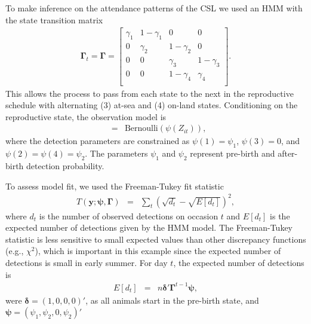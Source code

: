 \documentclass[12pt,english]{article}
\begin{document}
\begin{spacing}{1.9}
To make inference on the attendance patterns of the CSL we used an HMM
with the state transition matrix
\begin{eqnarray*}
  \boldsymbol{\Gamma}_t = \boldsymbol{\Gamma} =
  \left[ {\begin{array}{cccc}
            \gamma_1 & 1-\gamma_1 & 0 & 0 \\
            0 & \gamma_2 & 1-\gamma_2 & 0 \\
            0 & 0 & \gamma_3 & 1-\gamma_3 \\
            0 & 0 & 1-\gamma_4 & \gamma_4 \\
          \end{array} } \right].
\end{eqnarray*}
This allows the process to pass from each state to the next in the
reproductive schedule with alternating (3) at-sea and (4) on-land
states. Conditioning on the reproductive state, the observation model
is
\begin{eqnarray*}
  [y_{it}|Z_{it}] & = & \text{Bernoulli}(\psi(Z_{it})),
\end{eqnarray*}
where the detection parameters are constrained as $\psi(1) = \psi_1$,
$\psi(3) = 0$, and $\psi(2) = \psi(4) = \psi_2$. The parameters
$\psi_1$ and $\psi_2$ represent pre-birth and after-birth detection
probability.

To assess model fit, we used the Freeman-Tukey fit statistic
\begin{eqnarray*}
  T(\mathbf{y}; \boldsymbol{\psi},\boldsymbol{\Gamma}) & = &  \sum_t\left(\sqrt{d_t} - \sqrt{E[d_t]}\right)^2,
\end{eqnarray*}
where $d_t$ is the number of observed detections on occasion $t$ and
$E[d_t]$ is the expected number of detections given by the HMM
model. The Freeman-Tukey statistic is less sensitive to small expected values than other discrepancy
functions (e.g., $\chi^2$),
which is important in this example since the expected number of detections is small in early summer. 
For day $t$, the expected number of detections is
\begin{eqnarray*}
  E[d_t] & = & n \boldsymbol{\delta}'\boldsymbol{\Gamma}^{t-1}\boldsymbol{\psi},
\end{eqnarray*}
were $\boldsymbol{\delta} = (1, 0, 0, 0)'$, as all animals start in
the pre-birth state, and
$\boldsymbol{\psi} = (\psi_1 , \psi_2 , 0 , \psi_2)'$


\end{spacing}
\end{document}
